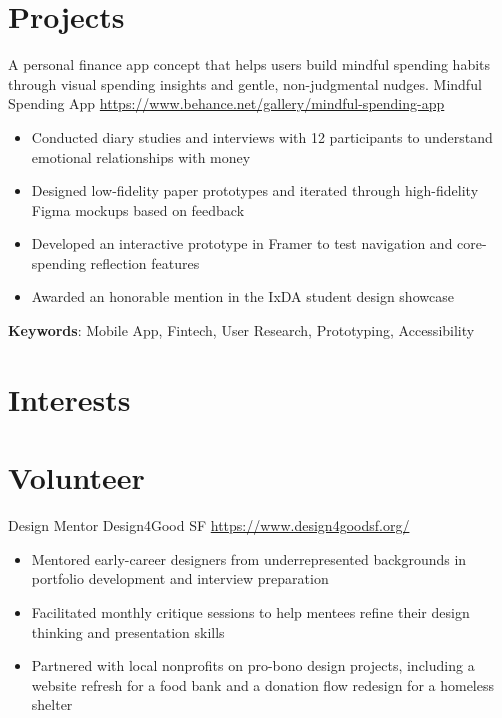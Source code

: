 \documentclass[a4paper, serif, 10pt]{moderncv}
\begin{document}
\section{Projects}

        {A personal finance app concept that helps users build mindful spending habits through visual spending insights and gentle, non-judgmental nudges.}
        {Mindful Spending App}
        {\url{https://www.behance.net/gallery/mindful-spending-app}}
        {}
        {\begin{itemize}
\item Conducted diary studies and interviews with 12 participants to understand emotional relationships with money
\item Designed low-fidelity paper prototypes and iterated through high-fidelity Figma mockups based on feedback
\item Developed an interactive prototype in Framer to test navigation and core-spending reflection features
\item Awarded an honorable mention in the IxDA student design showcase
\end{itemize}
\textbf{Keywords}: Mobile App, Fintech, User Research, Prototyping, Accessibility}
\section{Interests}

\section{Volunteer}

        {Design Mentor}
        {Design4Good SF}
        {\url{https://www.design4goodsf.org/}}
        {}
        {\begin{itemize}
\item Mentored early-career designers from underrepresented backgrounds in portfolio development and interview preparation
\item Facilitated monthly critique sessions to help mentees refine their design thinking and presentation skills
\item Partnered with local nonprofits on pro-bono design projects, including a website refresh for a food bank and a donation flow redesign for a homeless shelter
\end{itemize}}
\end{document}
